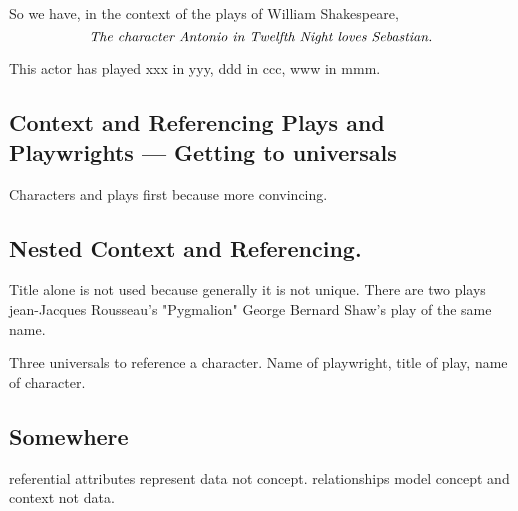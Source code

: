 \mynote 
So we have, in the context of the plays of William Shakespeare,
\begin{equation}
\label{AntonioLovesSebastian}
\mbox{\textit{The character Antonio in Twelfth Night loves Sebastian.}}
\end{equation} 


This actor has played xxx in yyy, ddd in ccc, www in mmm.

\subsection{Context and Referencing Plays and Playwrights --- Getting to universals}
Characters and plays first because more convincing.

\subsection{Nested Context and Referencing.}
\mynote Title alone is not used because generally it is not unique.
There are two plays jean-Jacques Rousseau's "Pygmalion"
George Bernard Shaw's play of the same name.

Three universals to reference a character. Name of playwright, title of play, name of character.

\subsection{Somewhere}
\mynote
referential attributes represent data not concept.
\mynote
relationships model concept and context not data.
 
